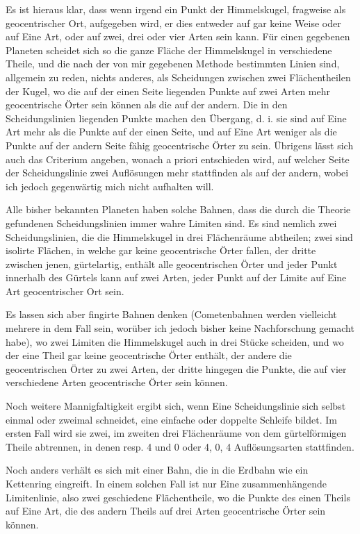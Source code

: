 Es ist hieraus klar, dass wenn irgend ein Punkt der Himmelskugel, fragweise
als geocentrischer Ort, aufgegeben wird, er dies entweder auf gar keine Weise
oder auf Eine Art, oder auf zwei, drei oder vier Arten sein kann. Für einen
gegebenen Planeten scheidet sich so die ganze Fläche der Himmelskugel in
verschiedene Theile, und die nach der von mir gegebenen Methode bestimmten
Linien sind, allgemein zu reden, nichts anderes, als Scheidungen zwischen
zwei Flächentheilen der Kugel, wo die auf der einen Seite liegenden Punkte
auf zwei Arten mehr geocentrische Örter sein können als die auf der
andern. Die in den Scheidungslinien liegenden Punkte machen den Übergang,
d. i. sie sind auf Eine Art mehr als die Punkte auf der einen Seite, und auf
Eine Art weniger als die Punkte auf der andern Seite fähig geocentrische Örter
zu sein. Übrigens lässt sich auch das Criterium angeben, wonach a priori
entschieden wird, auf welcher Seite der Scheidungslinie zwei Auflösungen mehr
stattfinden als auf der andern, wobei ich jedoch gegenwärtig mich nicht
aufhalten will\HistoricalNoteEight{Siehe Notiz 17.]}.

Alle bisher bekannten Planeten haben solche Bahnen, dass die durch die Theorie
gefundenen Scheidungslinien immer wahre Limiten sind. Es sind nemlich zwei
Scheidungslinien, die die Himmelskugel in drei Flächenräume abtheilen; zwei
sind isolirte Flächen, in welche gar keine geocentrische Örter fallen, der
dritte zwischen jenen, gürtelartig, enthält alle geocentrischen Örter und jeder
Punkt innerhalb des Gürtels kann auf zwei Arten, jeder Punkt auf der Limite
auf Eine Art geocentrischer Ort sein.

Es lassen sich aber fingirte Bahnen denken\HistoricalNoteDouble{Siehe Notiz 18.]} (Cometenbahnen werden
vielleicht mehrere in dem Fall sein, worüber ich jedoch bisher keine
Nachforschung gemacht habe), wo zwei Limiten die Himmelskugel auch in drei
Stücke scheiden, und wo der eine Theil gar keine geocentrische Örter enthält,
der andere die geocentrischen Örter zu zwei Arten, der dritte hingegen die
Punkte, die auf vier verschiedene Arten geocentrische Örter sein können.

Noch weitere Mannigfaltigkeit ergibt sich, wenn Eine Scheidungslinie sich
selbst einmal oder zweimal schneidet, eine einfache oder doppelte Schleife
bildet. Im ersten Fall wird sie zwei, im zweiten drei Flächenräume von dem
gürtelförmigen Theile abtrennen, in denen resp. 4 und 0 oder 4, 0, 4
Auflösungsarten stattfinden.

Noch anders verhält es sich mit einer Bahn, die in die Erdbahn wie ein
Kettenring eingreift. In einem solchen Fall ist nur Eine zusammenhängende
Limitenlinie, also zwei geschiedene Flächentheile, wo die Punkte des einen
Theils auf Eine Art, die des andern Theils auf drei Arten geocentrische Örter
sein können.

